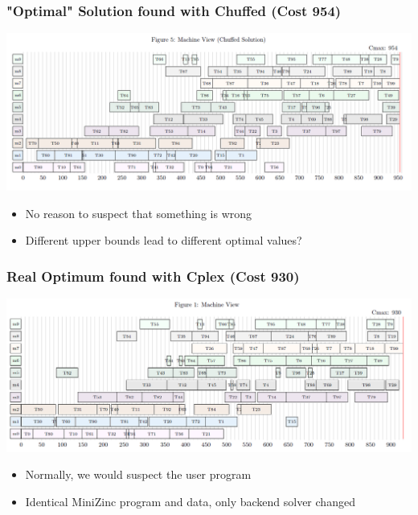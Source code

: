 \begin{frame}
\frametitle{"Optimal" Solution found with Chuffed (Cost 954)}
\includegraphics[width=14cm]{images/mt10machineschuffed.PNG}
\begin{itemize}
    \item No reason to suspect that something is wrong
    \item Different upper bounds lead to different optimal values?
\end{itemize}   
\end{frame}

\begin{frame}[label=mt10optimum]
\frametitle{Real Optimum found with Cplex (Cost 930)}
\includegraphics[width=14cm]{images/mt10machinescplex.PNG}
\begin{itemize}
\item Normally, we would suspect the user program
    \item Identical MiniZinc program and data, only backend solver changed
\end{itemize}
\end{frame}

